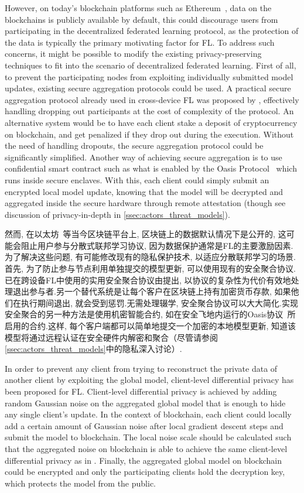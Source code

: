 However, on today's blockchain platforms such as Ethereum~\citep{wood2014ethereum}, data on the blockchains is publicly available by default, this could discourage users from participating in the decentralized federated learning protocol, as the protection of the data is typically the primary motivating factor for FL. To address such concerns, it might be possible to modify the existing privacy-preserving techniques to fit into the scenario of decentralized federated learning. First of all, to prevent the participating nodes from exploiting individually submitted model updates, existing secure aggregation protocols could be used. A practical secure aggregation protocol already used in cross-device FL was proposed by \citet{bonawitz17secagg}, effectively handling dropping out participants at the cost of complexity of the protocol. An alternative system would be to have each client stake a deposit of cryptocurrency on blockchain, and get penalized if they drop out during the execution. Without the need of handling dropouts, the secure aggregation protocol could be significantly simplified. Another way of achieving secure aggregation is to use confidential smart contract such as what is enabled by the Oasis Protocol~\citep{cheng2019ekiden} which runs inside secure enclaves. With this, each client could simply submit an encrypted local model update, knowing that the model will be decrypted and aggregated inside the secure hardware through remote attestation (though see discussion of privacy-in-depth in \cref{ssec:actors_threat_models}).

然而, 在以太坊~\citep{wood2014ethereum}等当今区块链平台上, 区块链上的数据默认情况下是公开的, 这可能会阻止用户参与分散式联邦学习协议, 因为数据保护通常是FL的主要激励因素.为了解决这些问题, 有可能修改现有的隐私保护技术, 以适应分散联邦学习的场景.首先, 为了防止参与节点利用单独提交的模型更新, 可以使用现有的安全聚合协议.已在跨设备FL中使用的实用安全聚合协议由\citet{bonawitz17secagg}提出, 以协议的复杂性为代价有效地处理退出参与者.另一个替代系统是让每个客户在区块链上持有加密货币存款, 如果他们在执行期间退出, 就会受到惩罚.无需处理辍学, 安全聚合协议可以大大简化.实现安全聚合的另一种方法是使用机密智能合约, 如在安全飞地内运行的Oasis协议~\citep{cheng2019ekiden}所启用的合约.这样, 每个客户端都可以简单地提交一个加密的本地模型更新, 知道该模型将通过远程认证在安全硬件内解密和聚合（尽管请参阅\cref{ssec:actors_threat_models}中的隐私深入讨论）.

In order to prevent any client from trying to reconstruct the private data of another client by exploiting the global model, client-level differential privacy \citep{mcmahan18dplm} has been proposed for FL.  Client-level differential privacy is achieved by adding random Gaussian noise on the aggregated global model that is enough to hide any single client's update. In the context of blockchain, each client could locally add a certain amount of Gaussian noise after local gradient descent steps and submit the model to blockchain. The local noise scale should be calculated such that the aggregated noise on blockchain is able to achieve the same client-level differential privacy as in \citep{mcmahan18dplm}. Finally, the aggregated global model on blockchain could be encrypted and only the participating clients hold the decryption key, which protects the model from the public.


